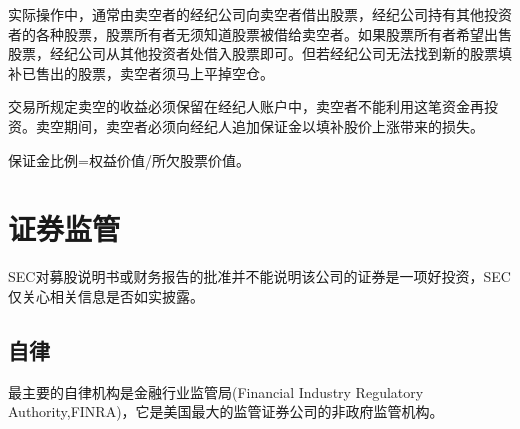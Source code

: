 \documentclass{article}
\begin{document}
实际操作中，通常由卖空者的经纪公司向卖空者借出股票，经纪公司持有其他投资者的各种股票，股票所有者无须知道股票被借给卖空者。如果股票所有者希望出售股票，经纪公司从其他投资者处借入股票即可。但若经纪公司无法找到新的股票填补已售出的股票，卖空者须马上平掉空仓。

交易所规定卖空的收益必须保留在经纪人账户中，卖空者不能利用这笔资金再投资。卖空期间，卖空者必须向经纪人追加保证金以填补股价上涨带来的损失。


保证金比例=权益价值/所欠股票价值。

\section{证券监管}
SEC对募股说明书或财务报告的批准并不能说明该公司的证券是一项好投资，SEC仅关心相关信息是否如实披露。
\subsection{自律}
最主要的自律机构是金融行业监管局(Financial Industry Regulatory Authority,FINRA)，它是美国最大的监管证券公司的非政府监管机构。
\end{document}
